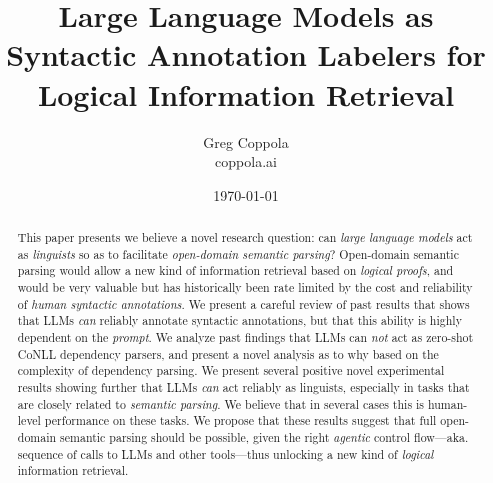 \documentclass[11pt]{article}
\title{Large Language Models as Syntactic Annotation Labelers for Logical Information Retrieval}
\author{Greg Coppola\\coppola.ai}
\date{\today}
\begin{document}
\maketitle

\begin{abstract}
    This paper presents we believe a novel research question: can {\em large language models} act as {\em linguists} so as to facilitate {\em open-domain semantic parsing}?
    Open-domain semantic parsing would allow a new kind of information retrieval based on {\em logical proofs}, and would be very valuable but has historically been rate limited by the cost and reliability of {\em human syntactic annotations}.
    We present a careful review of past results that shows that LLMs {\em can} reliably annotate syntactic annotations, but that this ability is highly dependent on the {\em prompt}.
    We analyze past findings that LLMs can {\em not} act as zero-shot CoNLL dependency parsers, and present a novel analysis as to why based on the complexity of dependency parsing.
    We present several positive novel experimental results showing further that LLMs {\em can} act reliably as linguists, especially in tasks that are closely related to {\em semantic parsing}.
    We believe that in several cases this is human-level performance on these tasks.
    We propose that these results suggest that full open-domain semantic parsing should be possible, given the right {\em agentic} control flow---aka. sequence of calls to LLMs and other tools---thus unlocking a new kind of {\em logical} information retrieval.
\end{abstract}
\end{document}
